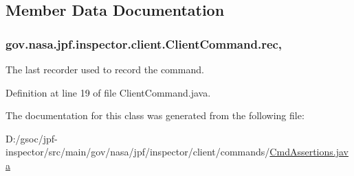 \subsection{Member Data Documentation}
\subsubsection[{\texorpdfstring{rec}{rec}}]{ gov.\+nasa.\+jpf.\+inspector.\+client.\+Client\+Command.\+rec\hspace{0.3cm}{\ttfamily [protected]}, {\ttfamily [inherited]}}\hypertarget{classgov_1_1nasa_1_1jpf_1_1inspector_1_1client_1_1_client_command_af4246f2427035c72a6af45a2c61361f7}{}\label{classgov_1_1nasa_1_1jpf_1_1inspector_1_1client_1_1_client_command_af4246f2427035c72a6af45a2c61361f7}


The last recorder used to record the command. 



Definition at line 19 of file Client\+Command.\+java.



The documentation for this class was generated from the following file\+:\begin{DoxyCompactItemize}
\item 
D\+:/gsoc/jpf-\/inspector/src/main/gov/nasa/jpf/inspector/client/commands/\hyperlink{_cmd_assertions_8java}{Cmd\+Assertions.\+java}\end{DoxyCompactItemize}
